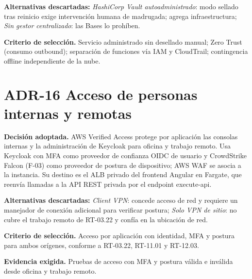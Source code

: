 \textbf{Alternativas descartadas:} \emph{HashiCorp Vault autoadministrado}: modo sellado tras reinicio exige intervención humana de madrugada; agrega infraestructura; \emph{Sin gestor centralizado}: las Bases lo prohíben.

\textbf{Criterio de selección.} Servicio administrado sin desellado manual; Zero Trust (consumo outbound); separación de funciones vía IAM y CloudTrail; contingencia offline independiente de la nube.

\section{ADR-16 \textperiodcentered{} Acceso de personas internas y remotas}
\label{sub:adr-16}

\textbf{Decisión adoptada.} AWS Verified Access protege por aplicación las consolas internas y la administración de Keycloak para oficina y trabajo remoto. Usa Keycloak con MFA como proveedor de confianza OIDC de usuario y CrowdStrike Falcon (F-03) como proveedor de postura de dispositivo; AWS WAF se asocia a la instancia. Su destino es el ALB privado del frontend Angular en Fargate, que reenvía llamadas a la API REST privada por el endpoint execute-api.

\textbf{Alternativas descartadas:} \emph{Client VPN}: concede acceso de red y requiere un manejador de conexión adicional para verificar postura; \emph{Solo VPN de sitio}: no cubre el trabajo remoto de RT-03.22 y confía en la ubicación de red.

\textbf{Criterio de selección.} Acceso por aplicación con identidad, MFA y postura para ambos orígenes, conforme a RT-03.22, RT-11.01 y RT-12.03.

\textbf{Evidencia exigida.} Pruebas de acceso con MFA y postura válida e inválida desde oficina y trabajo remoto.
